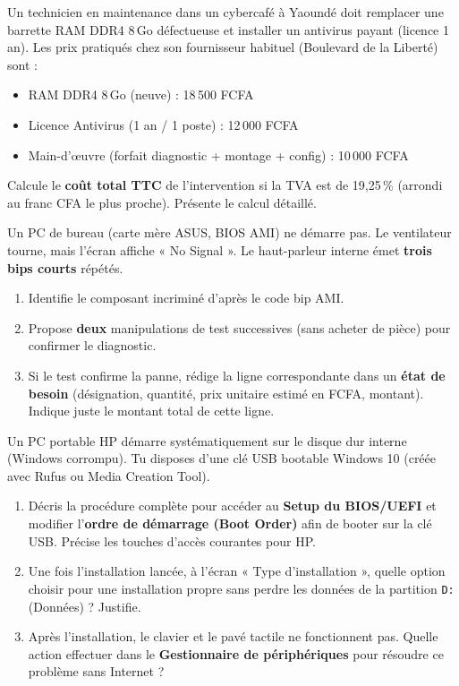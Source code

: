 \documentclass[11pt]{article}
\newcounter{popsec}
\newcounter{popsub}
\newcommand{\courssub}[1]{%
  \stepcounter{popsub}%
  \par\vspace{9pt}\noindent{\popxbold\fontsize{11.5}{13}\selectfont\color{popink}{\color{poporange}\thepopsec.\thepopsub}\hspace{6pt}#1}\par\nopagebreak\vspace{4pt}
}
\begin{document}
\begin{exercice}
Un technicien en maintenance dans un cybercafé à Yaoundé doit remplacer une barrette RAM DDR4 8\,Go défectueuse et installer un antivirus payant (licence 1 an). Les prix pratiqués chez son fournisseur habituel (Boulevard de la Liberté) sont :
\begin{itemize}
    \item RAM DDR4 8\,Go (neuve) : 18\,500 FCFA
    \item Licence Antivirus (1 an / 1 poste) : 12\,000 FCFA
    \item Main-d'œuvre (forfait diagnostic + montage + config) : 10\,000 FCFA
\end{itemize}
Calcule le \textbf{coût total TTC} de l'intervention si la TVA est de 19,25\,\% (arrondi au franc CFA le plus proche). Présente le calcul détaillé.
\end{exercice}

\courssub{Je m'entraîne}

\begin{exercice}
Un PC de bureau (carte mère ASUS, BIOS AMI) ne démarre pas. Le ventilateur tourne, mais l'écran affiche « No Signal ». Le haut-parleur interne émet \textbf{trois bips courts} répétés.
\begin{enumerate}
    \item Identifie le composant incriminé d'après le code bip AMI.
    \item Propose \textbf{deux} manipulations de test successives (sans acheter de pièce) pour confirmer le diagnostic.
    \item Si le test confirme la panne, rédige la ligne correspondante dans un \textbf{état de besoin} (désignation, quantité, prix unitaire estimé en FCFA, montant). Indique juste le montant total de cette ligne.
\end{enumerate}
\end{exercice}

\begin{exercice}
Un PC portable HP démarre systématiquement sur le disque dur interne (Windows corrompu). Tu disposes d'une clé USB bootable Windows 10 (créée avec Rufus ou Media Creation Tool).
\begin{enumerate}
    \item Décris la procédure complète pour accéder au \textbf{Setup du BIOS/UEFI} et modifier l'\textbf{ordre de démarrage (Boot Order)} afin de booter sur la clé USB. Précise les touches d'accès courantes pour HP.
    \item Une fois l'installation lancée, à l'écran « Type d'installation », quelle option choisir pour une installation propre sans perdre les données de la partition \texttt{D:} (Données) ? Justifie.
    \item Après l'installation, le clavier et le pavé tactile ne fonctionnent pas. Quelle action effectuer dans le \textbf{Gestionnaire de périphériques} pour résoudre ce problème sans Internet ?
\end{enumerate}
\end{exercice}
\end{document}
